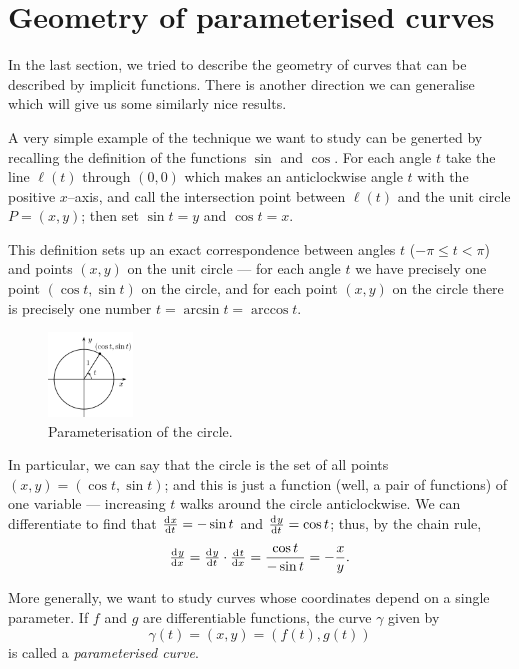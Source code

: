 \section{Geometry of parameterised curves}
In the last section, we tried to describe the geometry of curves that can be described by implicit functions. There is another direction we can
generalise which will give us some similarly nice results.

A very simple example of the technique we want to study can be generted by recalling the definition of the functions $ \sin $ and $ \cos $. For
each angle $ t $ take the line $ \ell (t) $ through $ (0,0) $ which makes an anticlockwise angle $ t $ with the positive $ x$--axis, and call the
intersection point between $ \ell (t) $ and the unit circle $ P = (x,y) $; then set $ \sin t = y $ and $ \cos t = x $.

This definition sets up an exact correspondence between angles $ t $ ($ -\pi \leq t < \pi $) and points $ (x,y) $ on the unit circle ---
for each angle $ t $ we have precisely one point $ (\cos t, \sin t) $ on the circle, and for each point $ (x,y) $ on the circle
there is precisely one number $ t = \arcsin t = \arccos t $.

\begin{figure}
  \centering
  \includegraphics[width=0.2\textwidth]{circle}
  \caption{Parameterisation of the circle.\label{fig:param1}}
\end{figure}

In particular, we can say that the circle is the set of all points $ (x,y) = (\cos t, \sin t) $; and this is just a function (well, a pair
of functions) of one variable --- increasing $ t $ walks around the circle anticlockwise. We can differentiate to find that $ \od{x}{t} = -\sin t $
and $ \od{y}{t} = \cos t $; thus, by the chain rule,
\begin{equation}
  \od{y}{x} = \od{y}{t} \cdot \od{t}{x} = \frac{\cos t}{-\sin t} = -\frac{x}{y}.
\end{equation}

More generally, we want to study curves whose coordinates depend on a single parameter. If $ f $ and $ g $ are
differentiable functions, the curve $ \gamma $ given by
\begin{equation}
  \gamma(t) = (x,y) = (f(t), g(t))
\end{equation}
is called a \emph{parameterised curve}.


